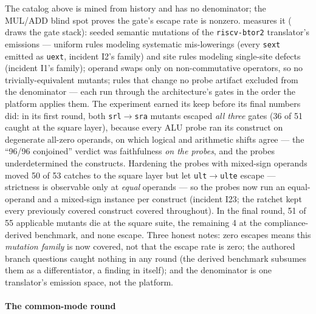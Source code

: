 The catalog above is mined from history and has no denominator; the
MUL/ADD blind spot proves the gate's escape rate is nonzero.
 measures it ( draws the gate
stack): seeded semantic mutations of the
\texttt{riscv-btor2} translator's emissions --- uniform rules modeling
systematic mis-lowerings (every \texttt{sext} emitted as \texttt{uext},
incident I2's family) and site rules modeling single-site defects
(incident I1's family); operand swaps only on non-commutative
operators, so no trivially-equivalent mutants; rules that change no
probe artifact excluded from the denominator --- each run through the
architecture's gates in the order the platform applies them. The
experiment earned its keep before its final numbers did: in its first
round, both \texttt{srl}$\to$\texttt{sra} mutants escaped \emph{all
three} gates (36 of 51 caught at the square layer), because every
ALU probe ran its construct on degenerate all-zero operands, on which
logical and arithmetic shifts agree --- the ``96/96 conjoined'' verdict
was faithfulness \emph{on the probes}, and the probes underdetermined
the constructs. Hardening the probes with mixed-sign operands moved 50
of 53 catches to the square layer but let \texttt{ult}$\to$\texttt{ulte}
escape --- strictness is observable only at \emph{equal} operands ---
so the probes now run an equal-operand and a mixed-sign instance per
construct (incident I23; the ratchet kept every previously covered
construct covered throughout). In the final round, 51 of 55 applicable
mutants die at the square suite, the remaining 4 at the
compliance-derived benchmark, and none escape. Three honest notes:
zero escapes means this \emph{mutation family} is now covered, not
that the escape rate is zero;
the authored branch questions caught nothing in any round (the derived
benchmark subsumes them as a differentiator, a finding in itself); and
the denominator is one translator's emission space, not the platform.

\paragraph{The common-mode round}



